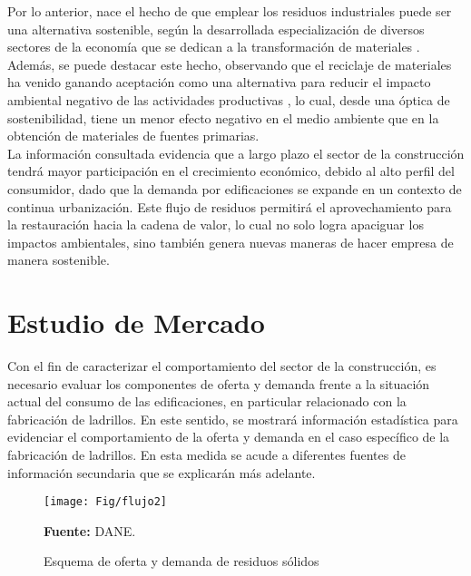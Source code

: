\documentclass[12pt]{article}
\begin{document}
Por lo anterior,  nace el hecho de que emplear los residuos industriales puede ser una alternativa sostenible, según la desarrollada especialización de diversos sectores de la economía que se dedican a la transformación de materiales \citep{boada2003reciclaje}. Además, se puede destacar este hecho, observando que el reciclaje de materiales ha venido ganando aceptación como una alternativa para reducir el impacto ambiental negativo de las actividades productivas \citep{medina1999reciclaje} , lo cual, desde una óptica de sostenibilidad, tiene un menor efecto negativo en el medio ambiente que en la obtención de materiales de fuentes primarias.\\

La información consultada evidencia  que a largo plazo el sector de la construcción tendrá mayor participación en el crecimiento económico, debido al alto perfil del consumidor, dado que la demanda por edificaciones se expande en un contexto de continua urbanización. Este flujo de residuos permitirá el aprovechamiento para la restauración hacia la cadena de valor, lo cual no solo logra apaciguar los impactos ambientales, sino también genera nuevas maneras de hacer empresa de manera sostenible.


\section{Estudio de Mercado}
Con el fin de caracterizar el comportamiento del sector de la construcción, es necesario evaluar los componentes de oferta y demanda frente a la situación actual del consumo de las edificaciones, en particular relacionado con la fabricación de ladrillos. En este sentido,  se mostrará información estadística para evidenciar el comportamiento de la oferta y demanda en el caso específico de la fabricación de ladrillos. En esta medida se acude a diferentes fuentes de información secundaria que se explicarán más adelante.   
\begin{figure}[H]
  	\centering 		
  	\caption{Esquema de oferta y demanda de residuos sólidos}
	\texttt{[image: Fig/flujo2]}
\raggedright  \scriptsize \textbf{Fuente:} DANE.
	\label{1}	
	\end{figure}
\end{document}
